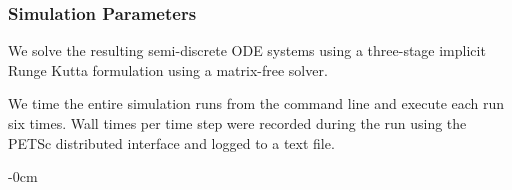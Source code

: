 \documentclass[asi,article,submit,moreauthors]{Definitions/mdpi}
\begin{document}
\subsubsection[\appendixname~\thesubsubsection]{Simulation Parameters}

We solve the resulting semi-discrete ODE systems using a three-stage implicit Runge Kutta formulation using a matrix-free solver.

We time the entire simulation runs from the command line and execute each run six times.
Wall times per time step were recorded during the run using the PETSc distributed interface and logged to a text file.

\begin{adjustwidth}{-\extralength}{0cm}






%


\PublishersNote{}
\end{adjustwidth}
\end{document}
